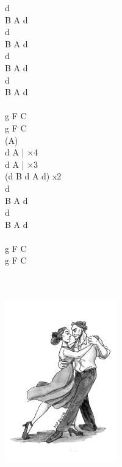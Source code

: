 \documentclass[a5paper, 10pt]{book}
\begin{document}
\begin{minipage}[t]{0.2\textwidth}
  d\\
  B A d\\
  d\\
  B A d\\
  d\\
  B A d\\
  d\\
  B A d\\
  \\
g F C\\
g F C\\
(A)\\
 d A | $\times$4\\
 d A | $\times$3\\
 (d B d A d) x2\\

 d\\
B A d\\
d\\
B A d\\
\\
g F C\\
g F C\\
\end{minipage}
~\\
~\\
\includegraphics[height=7cm, center]{takie_tango.png}\\

\newpage
\end{document}
